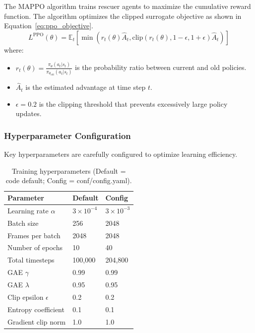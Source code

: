 \documentclass[11pt,a4paper]{article}
\begin{document}
The MAPPO algorithm trains rescuer agents to maximize the cumulative reward function.
The algorithm optimizes the clipped surrogate objective as shown in Equation~\ref{eq:ppo_objective}.
\begin{equation}
\label{eq:ppo_objective}
L^{\text{PPO}}(\theta) = \mathbb{E}_t \left[ \min \left( r_t(\theta) \hat{A}_t, \text{clip}(r_t(\theta), 1-\epsilon, 1+\epsilon) \hat{A}_t \right) \right]
\end{equation}
where:
\begin{itemize}
    \item $r_t(\theta) = \frac{\pi_\theta(a_t|s_t)}{\pi_{\theta_{\text{old}}}(a_t|s_t)}$ is the probability ratio between current and old policies.
    \item $\hat{A}_t$ is the estimated advantage at time step $t$.
    \item $\epsilon = 0.2$ is the clipping threshold that prevents excessively large policy updates.
\end{itemize}

\subsubsection{Hyperparameter Configuration}
\label{subsubsec:hyperparams}

Key hyperparameters are carefully configured to optimize learning efficiency.

\begin{table}[H]
\centering
\begin{tabular}{lll}
\toprule
\textbf{Parameter} & \textbf{Default} & \textbf{Config} \\
\midrule
Learning rate $\alpha$ & $3 \times 10^{-4}$ & $3 \times 10^{-3}$ \\
Batch size & 256 & 2048 \\
Frames per batch & 2048 & 2048 \\
Number of epochs & 10 & 40 \\
Total timesteps & 100,000 & 204,800 \\
GAE $\gamma$ & 0.99 & 0.99 \\
GAE $\lambda$ & 0.95 & 0.95 \\
Clip epsilon $\epsilon$ & 0.2 & 0.2 \\
Entropy coefficient & 0.1 & 0.1 \\
Gradient clip norm & 1.0 & 1.0 \\
\bottomrule
\end{tabular}
\caption{Training hyperparameters (Default = code default; Config = conf/config.yaml).}
\label{tab:hyperparams}
\end{table}
\end{document}
